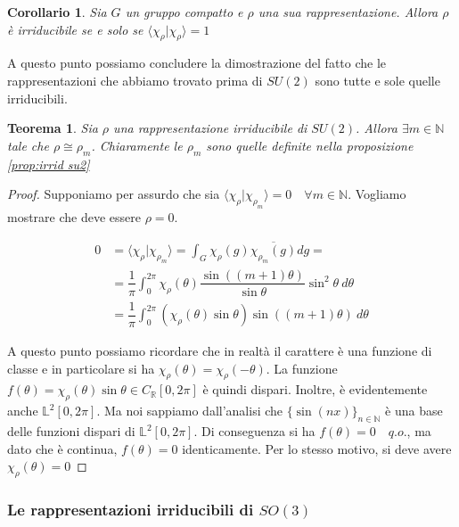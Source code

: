 \documentclass[11pt]{article}
\theoremstyle{plain}
\newtheorem{thm}{Teorema}[section]
\newtheorem*{cor}{Corollario}
\theoremstyle{definition}
\theoremstyle{remark}
\newcommand{\R}{\mathbb{R}}
\newcommand{\N}{\mathbb{N}}
\newcommand{\dint}{\displaystyle\int}
\begin{document}
 \begin{cor}
   Sia $G$ un gruppo compatto e $\rho$ una sua rappresentazione. Allora $\rho$ è irriducibile se e solo se $\langle \chi_\rho | \chi_\rho \rangle = 1$
 \end{cor}


 A questo punto possiamo concludere la dimostrazione del fatto che le rappresentazioni che abbiamo trovato prima di $SU(2)$ sono tutte e sole quelle irriducibili.


 \begin{thm}
   Sia $\rho$ una rappresentazione irriducibile di $SU(2)$. Allora $\exists m \in \N$ tale che $\rho \cong \rho_m$. Chiaramente le $\rho_m$ sono quelle definite nella proposizione \ref{prop:irrid su2}
 \end{thm}

 \begin{proof}
   Supponiamo per assurdo che sia $\langle \chi_\rho | \chi_{\rho_m} \rangle = 0 \quad \forall m \in \N$. Vogliamo mostrare che deve essere $\rho = 0$.


   \begin{align*}
     0 &= \langle \chi_\rho | \chi_{\rho_m} \rangle = \dint_G \chi_\rho(g) \overline{\chi_{\rho_m} (g)} dg = \\
     &= \dfrac{1}{\pi} \dint_0^{2\pi} \chi_\rho(\theta) \dfrac{\sin((m+1)\theta)}{\sin\theta} \sin^2\theta  \ d\theta \\
     &= \dfrac{1}{\pi} \dint_{0}^{2\pi} \left(\chi_\rho (\theta) \sin\theta \right) \sin(  (m+1) \theta) \ d\theta
   \end{align*}

   A questo punto possiamo ricordare che in realtà il carattere è una funzione di classe e in particolare si ha $\chi_\rho(\theta) = \chi_\rho(-\theta)$. La funzione $f(\theta) = \chi_\rho(\theta) \sin\theta \in C_\R[0,2\pi]$ è quindi dispari. Inoltre, è evidentemente anche $\mathbb{L}^2 [0,2\pi]$. Ma noi sappiamo dall'analisi che $\{\sin(nx)\}_{n\in \N}$ è una base delle funzioni dispari di $\mathbb{L}^2[0,2\pi]$. Di conseguenza si ha $f(\theta) = 0 \quad q.o.$, ma dato che è continua, $f(\theta) = 0$ identicamente. Per lo stesso motivo, si deve avere $\chi_\rho(\theta) = 0$

 \end{proof}


 \newpage
 \subsubsection{Le rappresentazioni irriducibili di $SO(3)$}
\end{document}
